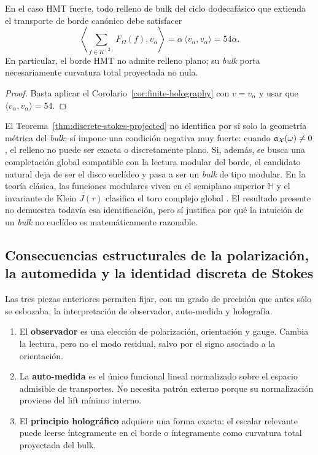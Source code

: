 \begin{corollary}\label{cor:hmt-bulk-curvature}
En el caso HMT fuerte, todo relleno de bulk del ciclo dodecafásico que extienda el transporte de
borde canónico debe satisfacer
\[
\left\langle \sum_{f\in K^{(2)}}F_\Omega(f),v_\alpha\right\rangle
=
\alpha\,\langle v_\alpha,v_\alpha\rangle
=
54\alpha.
\]
En particular, el borde HMT no admite relleno plano; su \emph{bulk} porta necesariamente curvatura
total proyectada no nula.
\end{corollary}

\begin{proof}
Basta aplicar el Corolario~\ref{cor:finite-holography} con $v=v_\alpha$ y usar que
$\langle v_\alpha,v_\alpha\rangle=54$.
\end{proof}



\begin{remark}
El Teorema~\ref{thm:discrete-stokes-projected} no identifica por sí solo la geometría métrica del
\emph{bulk}; sí impone una condición negativa muy fuerte: cuando $\mathfrak a_\mathcal X(\omega)\neq 0$, el
relleno no puede ser exacta o discretamente plano. Si, además, se busca una completación global
compatible con la lectura modular del borde, el candidato natural deja de ser el disco euclídeo y pasa
a ser un \emph{bulk} de tipo modular. En la teoría clásica, las funciones modulares viven en el
semiplano superior $\mathbb H$ y el invariante de Klein $J(\tau)$ clasifica el toro complejo global
\cite{DLMFModular}. El resultado presente no demuestra todavía esa identificación, pero sí justifica
por qué la intuición de un \emph{bulk} no euclídeo es matemáticamente razonable.
\end{remark}

\subsection{Consecuencias estructurales de la polarización, la automedida y la identidad discreta de Stokes}

Las tres piezas anteriores permiten fijar, con un grado de precisión que antes sólo se esbozaba,
la interpretación de observador, auto-medida y holografía.

\begin{enumerate}[label=\textup{(\arabic*)}]
\item El \textbf{observador} es una elección de polarización, orientación y gauge. Cambia la lectura,
pero no el modo residual, salvo por el signo asociado a la orientación.
\item La \textbf{auto-medida} es el único funcional lineal normalizado sobre el espacio admisible de
transportes. No necesita patrón externo porque su normalización proviene del lift mínimo interno.
\item El \textbf{principio holográfico} adquiere una forma exacta: el escalar relevante puede leerse
íntegramente en el borde o íntegramente como curvatura total proyectada del bulk.
\end{enumerate}

